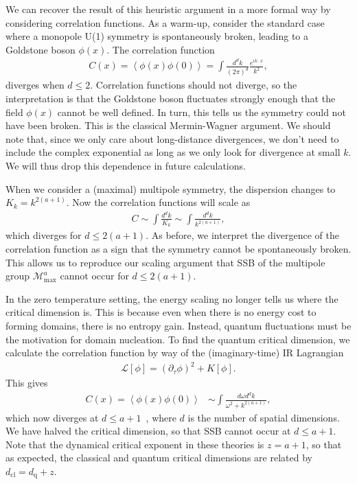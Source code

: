 \documentclass[prb,aps,twocolumn, amsfonts,amsmath,amssymb,nofootinbib,superscriptaddress]{revtex4-2}
\renewcommand{\max}{\text{max}}
\begin{document}
We can recover the result of this heuristic argument in a more formal way by considering correlation functions.
As a warm-up, consider the standard case where a monopole U(1) symmetry is spontaneously broken, leading to a Goldstone boson $\phi(x)$. The correlation function
\begin{align}
C(x) = \left\langle \phi(x) \phi(0) \right\rangle = \int \frac{d^dk}{(2\pi)^d} \frac{e^{i k \cdot x}}{k^2}, 
\end{align}
diverges when $d\le 2$. Correlation functions should not diverge, so the interpretation is that the Goldstone boson fluctuates strongly enough that the field $\phi(x)$ cannot be well defined. In turn, this tells us the symmetry could not have been broken. This is the classical Mermin-Wagner argument. We should note that, since we only care about long-distance divergences, we don't need to include the complex exponential as long as we only look for divergence at small $k$. We will thus drop this dependence in future calculations. 

When we consider a (maximal) multipole symmetry, the dispersion changes to $K_k=k^{2(a+1)}$. Now the correlation functions will scale as 
\begin{align}
C \sim \int \frac{d^dk}{K_k} \sim \int \frac{d^dk}{k^{2(a+1)}}, \label{eqn:correl}
\end{align}
which diverges for $d\le2(a+1)$. As before, we interpret the divergence of the correlation function as a sign that the symmetry cannot be spontaneously broken. This allows us to reproduce our scaling argument that SSB of the multipole group $\mathcal{M}^a_\max$ cannot occur for $d\le2(a+1)$.

In the zero temperature setting, the energy scaling no longer tells us where the critical dimension is. This is because even when there is no energy cost to forming domains, there is no entropy gain. Instead, quantum fluctuations must be the motivation for domain nucleation. To find the quantum critical dimension, we calculate the correlation function by way of the (imaginary-time) IR Lagrangian 
\begin{align}
     \mathcal{L}[\phi] = (\partial_\tau\phi)^2 + K[\phi].
\end{align} 
This gives 
\begin{align}
\label{tzerocorr}C(x) = \left\langle \phi(x) \phi(0) \right\rangle &\sim \int \frac{d\omega d^dk}{\omega^2 + k^{2( a + 1 )}},
\end{align}
which now diverges at $d\le a+1$~\cite{Griffin2015}, where $d$ is the number of spatial dimensions. We have halved the critical dimension, so that SSB cannot occur at $d\le a+1$. Note that the dynamical critical exponent in these theories is $z = a+1$, so that as expected, the classical and quantum critical dimensions are related by $d_\text{cl} = d_\text{q} + z$.
\end{document}
